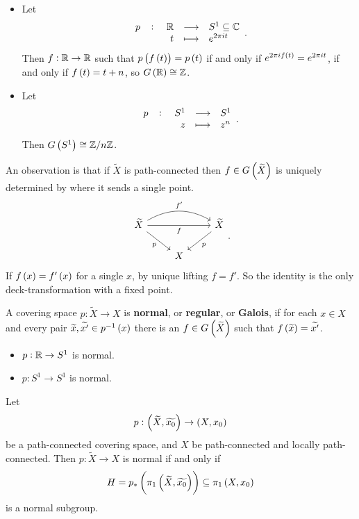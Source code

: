 \begin{example*}
\hfill
\begin{itemize}
\item Let
$$ \function[p]{\R}{S^1 \subseteq \C}{t}{e^{2\pi i t}}. $$
Then $ f : \mathbb{R} \to \mathbb{R} $ such that $ p\br{f\br{t}} = p\br{t} $ if and only if $ e^{2\pi if\br{t}} = e^{2\pi it} $, if and only if $ f\br{t} = t + n $, so $ G\br{\R} \cong \Z $.
\item Let
$$ \function[p]{S^1}{S^1}{z}{z^n}. $$
Then $ G\br{S^1} \cong \Z / n\Z $.
\end{itemize}
\end{example*}

An observation is that if $ \widetilde{X} $ is path-connected then $ f \in G\br{\widetilde{X}} $ is uniquely determined by where it sends a single point.
$$
\begin{tikzcd}
\widetilde{X} \arrow[swap]{rr}{f} \arrow[bend left=30]{rr}{f'} \arrow[swap]{dr}{p} & & \widetilde{X} \arrow{dl}{p} \\
& X &
\end{tikzcd}.
$$
If $ f\br{x} = f'\br{x} $ for a single $ x $, by unique lifting $ f = f' $. So the identity is the only deck-transformation with a fixed point.

\begin{definition*}
A covering space $ p : \widetilde{X} \to X $ is \textbf{normal}, or \textbf{regular}, or \textbf{Galois}, if for each $ x \in X $ and every pair $ \widetilde{x}, \widetilde{x'} \in p^{-1}\br{x} $ there is an $ f \in G\br{\widetilde{X}} $ such that $ f\br{\widetilde{x}} = \widetilde{x'} $.
\end{definition*}

\begin{example*}
\hfill
\begin{itemize}
\item $ p : \mathbb{R} \to S^1 $ is normal.
\item $ p : S^1 \to S^1 $ is normal.
\end{itemize}
\end{example*}

\begin{proposition}
Let
$$ p : \br{\widetilde{X}, \widetilde{x_0}} \to \br{X, x_0} $$
be a path-connected covering space, and $ X $ be path-connected and locally path-connected. Then $ p : \widetilde{X} \to X $ is normal if and only if
$$ H = p_*\br{\pi_1\br{\widetilde{X}, \widetilde{x_0}}} \subseteq \pi_1\br{X, x_0} $$
is a normal subgroup.
\end{proposition}

